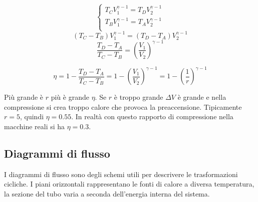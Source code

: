 \[\left\{
\begin{array}{l}
T_CV_1^{\gamma-1}=T_DV_2^{\gamma-1}\\
T_BV_1^{\gamma-1}=T_AV_2^{\gamma-1}\\
\end{array}\right.\]
\[(T_C-T_B)V_1^{\gamma-1}=(T_D-T_A)V_2^{\gamma-1}\]
\[\frac{T_D-T_A}{T_C-T_B}=\left(\frac{V_1}{V_2}\right)^{\gamma-1}\]

\[\eta=1-\frac{T_D-T_A}{T_C-T_B}=1-\left(\frac{V_1}{V_2}\right)^{\gamma-1}\!\!\!\!\!\!\!\!\! =1-\left(\frac{1}{r}\right)^{\gamma-1}\]

Più grande è $r$ più è grande $\eta$. Se $r$ è troppo grande $\Delta V$ è grande e nella compressione si crea troppo calore che provoca la preaccensione. Tipicamente $r=5$, quindi $\eta=0.55$. In realtà con questo rapporto di compressione nella macchine reali si ha $\eta=0.3$.

\subsection{Diagrammi di flusso}
I diagrammi di flusso sono degli schemi utili per descrivere le trasformazioni cicliche. I piani orizzontali rappresentano le fonti di calore a diversa temperatura, la sezione del tubo varia a seconda dell'energia interna del sistema.

